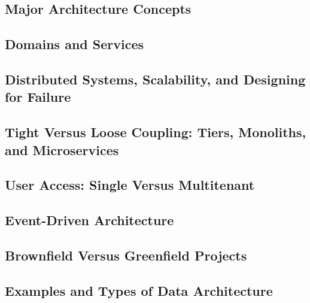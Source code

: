 \subsection{Major Architecture Concepts}


\subsection*{Domains and Services}


\subsection*{Distributed Systems, Scalability, and Designing for Failure}


\subsection*{Tight Versus Loose Coupling: Tiers, Monoliths, and Microservices}


\subsection*{User Access: Single Versus Multitenant}


\subsection*{Event-Driven Architecture}


\subsection*{Brownfield Versus Greenfield Projects}







\subsection{Examples and Types of Data Architecture}






